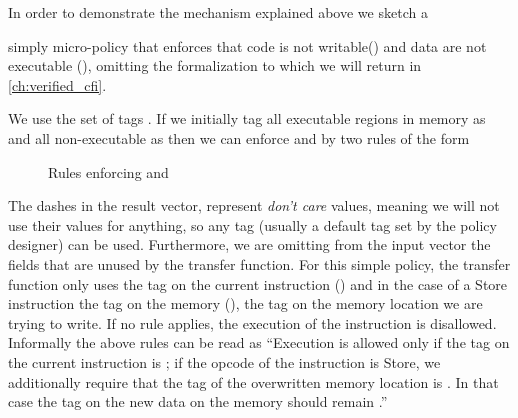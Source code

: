 


In order to demonstrate the mechanism explained above we sketch a

simply micro-policy that enforces that code is not writable(\NWC) and
data are not executable (\NXD), omitting the formalization to which we
will return in \cref{ch:verified_cfi}.

We use the set of tags \TAGS{\DATA,\INSTRname}. If we initially tag
all executable regions in memory as \INSTRname and all non-executable
as \DATAname then we can enforce \NWC and \NXD by two rules of the form

\begin{figure}[htb!]
\bigskip

\bigskip

\caption{Rules enforcing \NWC and \NXD}
\end{figure}

The dashes in the result vector, represent \textit{don't care} values,
meaning we will not use their values for anything, so any tag (usually
a default tag set by the policy designer) can be used.
Furthermore, we are omitting from the input vector the fields that are
unused by the transfer function. For this simple policy, the transfer
function only uses the tag on the current instruction () and in
the case of a Store instruction the tag on the memory (), \IE
the tag on the memory location we are trying to write. If no rule
applies, the execution of the instruction is disallowed. Informally
the above rules can be read as ``Execution is allowed only if the tag
on the current instruction is \INSTRname; if the opcode of the
instruction is Store, we additionally require that the tag of the
overwritten memory location is \DATA. In that case the tag on the new
data on the memory should remain \DATA.''

